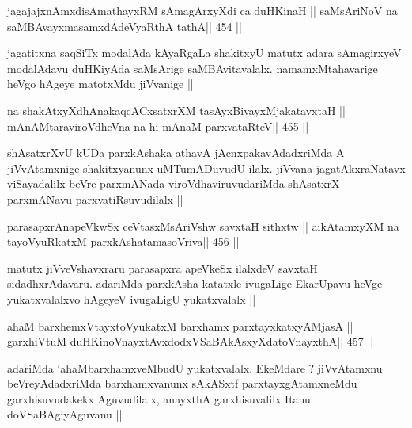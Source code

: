 \begin{shl}
jagajajxnAmxdisAmathayxRM sAmagArxyXdi ca duHKinaH ||
saMsAriNoV na saMBAvayxmasamxdAdeVyaRthA tathA\hfill || 454 ||
\end{shl}

\begin{artha}
jagatitxna saqSiTx modalAda kAyaRgaLa  shakitxyU matutx adara
sAmagirxyeV modalAdavu duHKiyAda saMsArige saMBAvitavalalx.
namamxMtahavarige heVgo hAgeye matotxMdu jiVvanige ||
\end{artha}

\begin{shl}
na shakAtxyXdhAnakaqcACxsatxrXM tasAyxBivayxMjakatavxtaH ||
mAnAMtaraviroVdheVna na hi mAnaM parxvataRteV\hfill || 455 ||
\end{shl}

\begin{artha}
shAsatxrXvU kUDa parxkAshaka athavA jAcnxpakavAdadxriMda
A jiVvAtamxnige shakitxyanunx uMTumADuvudU ilalx. jiVvana
jagatAkxraNatavx viSayadalilx beVre parxmANada viroVdhaviruvudariMda
shAsatxrX parxmANavu parxvatiRsuvudilalx ||
\end{artha}




\begin{shl}
parasapxrAnapeVkwSx ceVtasxMsAriVshw savxtaH sithxtw ||
aikAtamxyXM na tayoVyuRkatxM parxkAshatamasoVriva\hfill || 456 ||
\end{shl}

\begin{artha}
matutx jiVveVshavxraru parasapxra apeVkeSx ilalxdeV savxtaH
sidadhxrAdavaru. adariMda parxkAsha katatxle ivugaLige EkarUpavu
heVge yukatxvalalxvo hAgeyeV ivugaLigU yukatxvalalx ||
\end{artha}


\begin{shl}
ahaM barxhemxVtayxtoV\s yukatxM barxhamx parxtayxkatxyA\s MjasA ||
garxhiVtuM duHKinoV\s nayxtAvxdodxVSaBAkAsxyXdatoV\s nayxthA\hfill || 457 ||
\end{shl}

\begin{artha}
adariMda `ahaMbarxhamxveMbudU yukatxvalalx, EkeMdare ?
jiVvAtamxnu beVreyAdadxriMda barxhamxvanunx sAkASxtf
parxtayxgAtamxneMdu garxhisuvudakekx Aguvudilalx, anayxthA
garxhisuvalilx Itanu doVSaBAgiyAguvanu ||
\end{artha}


